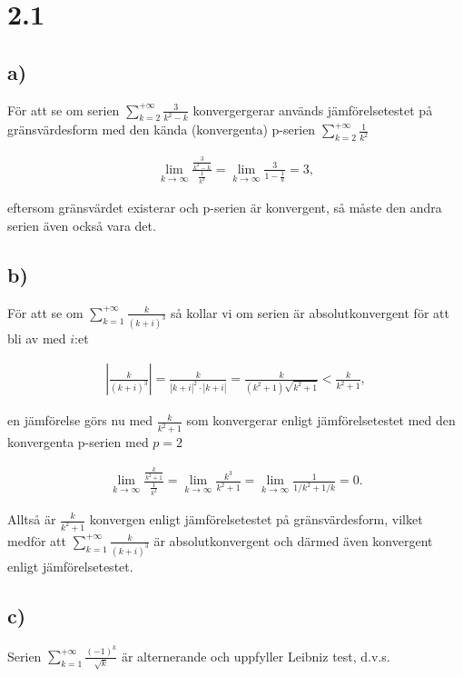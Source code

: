 \documentclass[a4paper]{article}
\begin{document}
\section*{2.1}
\subsection*{a)}
För att se om serien $\sum_{k=2}^{+\infty}\frac{3}{k^2-k}$ konvergergerar
används jämförelsetestet på gränsvärdesform med den kända (konvergenta) p-serien
$\sum_{k=2}^{+\infty}\frac{1}{k^2}$

\begin{align*}
  \lim_{k\to\infty} \frac{\frac{3}{k^2-k}}{\frac{1}{k^2}} = \lim_{k\to\infty}
  \frac{3}{1 - \frac{1}{k}} = 3,
\end{align*}

eftersom gränsvärdet existerar och p-serien är konvergent, så måste den andra
serien även också vara det.

\subsection*{b)}

För att se om $\sum_{k=1}^{+\infty}\frac{k}{(k+i)^3}$ så kollar vi om serien är
absolutkonvergent för att bli av med $i$:et

\begin{align*}
  \left|\frac{k}{(k+i)^3}\right| = \frac{k}{\left| k+i \right|^2\cdot\left| k + i \right|} = \frac{k}{(k^2+1)\sqrt{k^2+1}} < \frac{k}{k^2+1},
\end{align*}

en jämförelse görs nu med $\frac{k}{k^2+1}$ som konvergerar enligt
jämförelsetestet med den konvergenta p-serien med $p=2$

\begin{align*}
  \lim_{k\to\infty} \frac{\frac{k}{k^2+1}}{\frac{1}{k^2}} = \lim_{k\to\infty} \frac{k^3}{k^2+1} = \lim_{k\to\infty} \frac{1}{1/k^2 + 1/k} = 0.
\end{align*}

Alltså är $\frac{k}{k^2+1}$ konvergen enligt jämförelsetestet på
gränsvärdesform, vilket medför att $\sum_{k=1}^{+\infty}\frac{k}{(k+i)^3}$ är
absolutkonvergent och därmed även konvergent enligt jämförelsetestet.

\subsection*{c)}

Serien $\sum_{k=1}^{+\infty}\frac{(-1)^k}{\sqrt{k}}$ är alternerande och
uppfyller Leibniz test, d.v.s.
\end{document}
